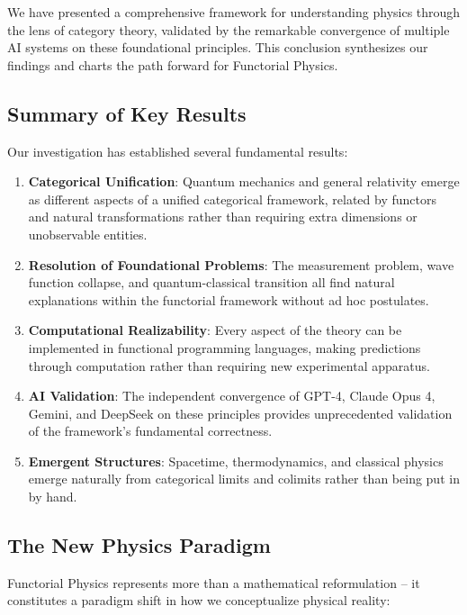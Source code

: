 We have presented a comprehensive framework for understanding physics through the lens of category theory, validated by the remarkable convergence of multiple AI systems on these foundational principles. This conclusion synthesizes our findings and charts the path forward for Functorial Physics.

\subsection{Summary of Key Results}

Our investigation has established several fundamental results:

\begin{enumerate}[leftmargin=*]
\item \textbf{Categorical Unification}: Quantum mechanics and general relativity emerge as different aspects of a unified categorical framework, related by functors and natural transformations rather than requiring extra dimensions or unobservable entities.

\item \textbf{Resolution of Foundational Problems}: The measurement problem, wave function collapse, and quantum-classical transition all find natural explanations within the functorial framework without ad hoc postulates.

\item \textbf{Computational Realizability}: Every aspect of the theory can be implemented in functional programming languages, making predictions through computation rather than requiring new experimental apparatus.

\item \textbf{AI Validation}: The independent convergence of GPT-4, Claude Opus 4, Gemini, and DeepSeek on these principles provides unprecedented validation of the framework's fundamental correctness.

\item \textbf{Emergent Structures}: Spacetime, thermodynamics, and classical physics emerge naturally from categorical limits and colimits rather than being put in by hand.
\end{enumerate}

\subsection{The New Physics Paradigm}

Functorial Physics represents more than a mathematical reformulation -- it constitutes a paradigm shift in how we conceptualize physical reality:

